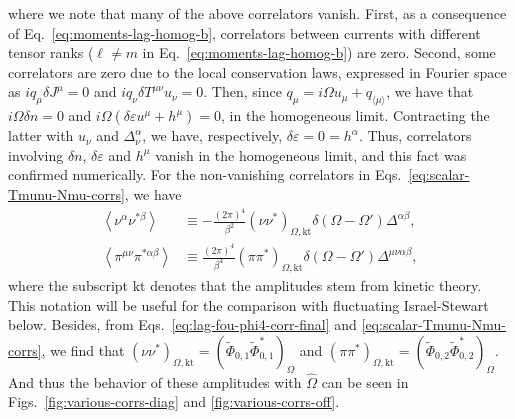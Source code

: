 \documentclass[aps,prd,preprint,nofootinbib,amsmath,amssymb,showpacs,longbibliography,singlecolumn,superscriptaddress,10pt]{revtex4-1}
\theoremstyle{plain}
\theoremstyle{definition}
\begin{document}
% 
where we note that many of the above correlators vanish. First, as a consequence of Eq.~\eqref{eq:moments-lag-homog-b}, correlators between currents with different tensor ranks ($\ell \neq m$ in Eq.~\eqref{eq:moments-lag-homog-b}) are zero. Second, some correlators are zero due to the local conservation laws, expressed in Fourier space as $i q_{\mu} \delta J^{\mu} = 0$ and $i q_{\nu} \delta T^{\mu \nu}u_{\nu} = 0$. Then, since $q_{\mu} = i \Omega u_{\mu} + q_{\langle \mu \rangle}$, we have that $i \Omega \delta n = 0$ and $i \Omega (\delta \varepsilon u^{\mu} + h^{\mu}) = 0$, in the homogeneous limit. Contracting the latter with $u_{\nu}$ and $\Delta_{\nu}^{\alpha}$, we have, respectively, $\delta \varepsilon = 0 = h^{\alpha}$. Thus, correlators involving $\delta n$, $\delta \varepsilon$ and $h^{\mu}$ vanish in the homogeneous limit, and this fact was confirmed numerically. For the non-vanishing correlators in Eqs.~\eqref{eq:scalar-Tmunu-Nmu-corrs}, we have
%
\begin{equation}
\label{eq:diffusion-shear-amplitude}
\begin{aligned}
\left\langle \nu^{\alpha}
\nu^{*\beta} \right\rangle
&\equiv
-\frac{(2 \pi)^{4}}{\beta^{2}}\left( \nu
\nu^{*} \right)_{\Omega, \mathrm{kt}}
\delta(\Omega-\Omega') \Delta^{\alpha \beta},
\\
\left\langle \pi^{\mu \nu} \pi^{*\alpha\beta} \right\rangle
&
\equiv
\frac{(2 \pi)^{4}}{\beta^{4}}
\left( \pi \pi^{*} \right)_{\Omega, \mathrm{kt}}
\delta(\Omega-\Omega') \Delta^{\mu \nu \alpha \beta},
\end{aligned}    
\end{equation}
%
where the subscript $\mathrm{kt}$ denotes that the amplitudes stem from kinetic theory. This notation will be useful for the comparison with fluctuating Israel-Stewart below. Besides, from Eqs.~\eqref{eq:lag-fou-phi4-corr-final} and \eqref{eq:scalar-Tmunu-Nmu-corrs}, we find that $\left( \nu
\nu^{*} \right)_{\Omega, \mathrm{kt}} = \left( \widetilde{\Phi}_{0,1}
\widetilde{\Phi}_{0,1}^{*}
 \right)_{\Omega}$ and  
$\left( \pi \pi^{*} \right)_{\Omega, \mathrm{kt}} = \left( \widetilde{\Phi}_{0,2}
\widetilde{\Phi}_{0,2}^{*}
 \right)_{\Omega}$. And thus the behavior of these amplitudes with $\widehat{\Omega}$ can be seen in Figs.~\ref{fig:various-corrs-diag} and \ref{fig:various-corrs-off}.
\end{document}
